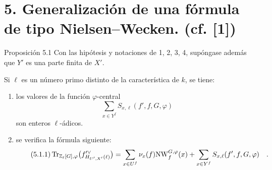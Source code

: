 \section*{5. Generalización de una fórmula de tipo Nielsen--Wecken. {\normalfont (cf. [1])}}

\begin{statement}{Proposición 5.1}
Con las hipótesis y notaciones de 1, 2, 3, 4, supóngase además que $Y'$ es una parte finita de $X'$.

Si $\ell$ es un número primo distinto de la característica de $k$, se tiene:
\begin{enumerate}[label=\alph*)]
\item los valores de la función $\varphi$-central
\[
\sum_{x\in Y^f} S_{x,\ell}(f',f,G,\varphi)
\]
son enteros $\ell$-ádicos.
\item se verifica la fórmula siguiente:
\begin{equation}\tag{5.1.1}
\operatorname{Tr}_{\mathbb Z_\ell[G],\varphi}\bigl(f'^\vee_{H_{U',X'}(\ell)}\bigr)
= \sum_{x\in U^f}\nu_x(f)\mathrm{NW}^{G,\varphi}_f(x)+\sum_{x\in Y^f}S_{x,\ell}(f',f,G,\varphi) \quad .
\end{equation}
\end{enumerate}
\end{statement}
